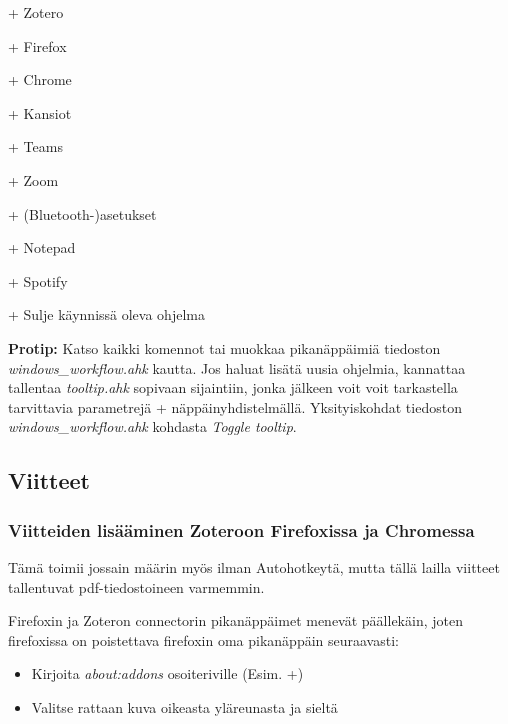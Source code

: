 \documentclass[a4paper,12pt]{scrartcl}
\begin{document}
+ Zotero

+ Firefox

+\keys{\shift} Chrome

+ Kansiot

+ Teams

+ Zoom

+ (Bluetooth-)asetukset

+ Notepad

+ Spotify

+ Sulje käynnissä oleva ohjelma

\textbf{Protip:} Katso kaikki komennot tai muokkaa pikanäppäimiä tiedoston \emph{windows\_workflow.ahk} kautta. Jos haluat lisätä uusia ohjelmia, kannattaa tallentaa \emph{tooltip.ahk} sopivaan sijaintiin, jonka jälkeen voit voit tarkastella tarvittavia parametrejä + näppäinyhdistelmällä. Yksityiskohdat tiedoston \emph{windows\_workflow.ahk} kohdasta \emph{Toggle tooltip}.

\subsection{Viitteet}

\subsubsection{Viitteiden lisääminen Zoteroon Firefoxissa ja Chromessa}

Tämä toimii jossain määrin myös ilman Autohotkeytä, mutta tällä lailla viitteet tallentuvat pdf-tiedostoineen varmemmin.

Firefoxin ja Zoteron connectorin pikanäppäimet menevät päällekäin, joten firefoxissa on poistettava firefoxin oma pikanäppäin seuraavasti:
\begin{itemize}
	\item Kirjoita \emph{about:addons} osoiteriville (Esim. +)
	\item Valitse rattaan kuva oikeasta yläreunasta ja sieltä 
\end{itemize} 
\end{document}
